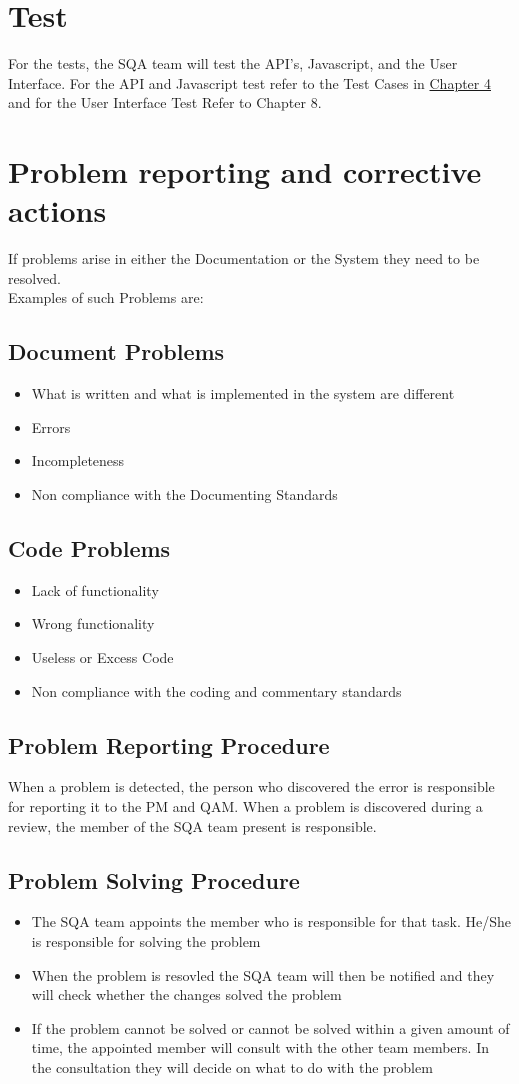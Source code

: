 \documentclass{report}
\begin{document}
\section{Test}
For the tests, the SQA team will test the API's, Javascript, and the User Interface. For the API and Javascript test refer to the Test Cases in \hyperref[chap:Test Cases]{Chapter 4} and for the User Interface Test Refer to Chapter 8. 

\section{Problem reporting and corrective actions}
If problems arise in either the Documentation or the System they need to be resolved. \\
Examples of such Problems are:
\subsection*{Document Problems}
\begin{itemize}
\item What is written and what is implemented in the system are different
\item Errors
\item Incompleteness
\item Non compliance with the Documenting Standards
\end{itemize}
\subsection*{Code Problems}
\begin{itemize}
\item Lack of functionality
\item Wrong functionality
\item Useless or Excess Code
\item Non compliance with the coding and commentary standards
\end{itemize}
\subsection*{Problem Reporting Procedure}
When a problem is detected, the person who discovered the error is responsible for reporting it to the PM and QAM. When a problem is discovered during a review, the member of the SQA team present is responsible.
\subsection*{Problem Solving Procedure}
\begin{itemize}
\item The SQA team appoints the member who is responsible for that task. He/She is responsible for solving the problem
\item When the problem is resovled the SQA team will then be notified and they will check whether the changes solved the problem
\item If the problem cannot be solved or cannot be solved within a given amount of time, the appointed member will consult with the other team members. In the consultation they will decide on what to do with the problem
\end{itemize}
\end{document}
